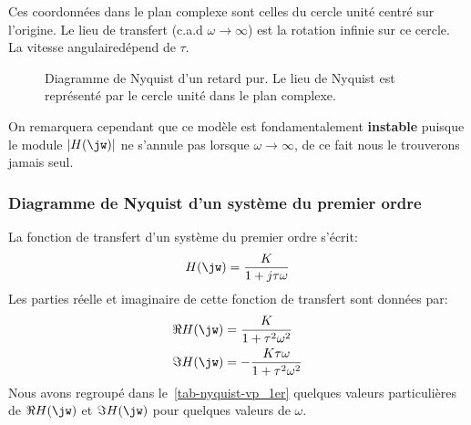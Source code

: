 Ces coordonnées dans le plan complexe sont celles du cercle unité 
centré sur l'origine. Le lieu de transfert (c.a.d $\omega\to\infty$) 
est la rotation infinie sur ce cercle. La \og vitesse angulaire\fg dépend de $\tau$.

\begin{figure}[!h]                                                                                                           
\begin{center}                                                                                                               
\end{center}
\caption{Diagramme de Nyquist d'un retard pur. Le lieu de Nyquist 
    est représenté par le cercle unité dans le plan complexe.\label{fig-nyquist_4}}
\end{figure}

On remarquera cependant que ce modèle est fondamentalement \textbf{instable} puisque 
le module $|H(\jw)|$ ne s'annule pas lorsque $\omega\to\infty$, de ce fait nous 
le trouverons jamais seul.

\newpage

\subsubsection{Diagramme de Nyquist d'un système du premier ordre}

La fonction de transfert d'un système du premier ordre s'écrit:
$$
H(\jw)=\dfrac{K}{1+j\tau\omega}
$$
Les parties réelle et imaginaire de cette fonction de transfert sont données par:
\begin{align*}
    \Re{H(\jw)}&=\dfrac{K}{1+\tau^2\omega^2}\\
    \Im{H(\jw)}&=-\dfrac{K\tau\omega}{1+\tau^2\omega^2}\\
\end{align*}
Nous avons regroupé dans le~\cref{tab-nyquist-vp_1er} quelques valeurs particulières 
de $\Re{H(\jw)}$ et $\Im{H(\jw)}$ pour quelques valeurs de $\omega$.

